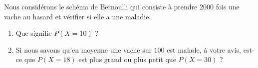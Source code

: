 
\begin{exercice}\label{exoPremiere-0077}

    Nous considérons le schéma de Bernoulli qui consiste à prendre \( 2000\) fois une vache au hasard et vérifier si elle a une maladie. 
    \begin{enumerate}
        \item
            Que signifie \( P(X=10)\) ?
        \item
            Si nous savons qu'en moyenne une vache sur \( 100\) est malade, à votre avis, est-ce que \( P(X=18)\) est plus grand ou plus petit que \( P(X=30)\) ?
    \end{enumerate}

\end{exercice}
